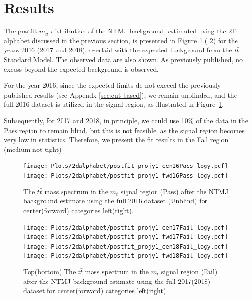 

\section{Results}
\label{sec:results}



The postfit $m_{t\bar{t}}$ distribution of the NTMJ background, estimated using the 2D alphabet discussed in the previous section, is presented in Figure \ref{fig:mttbar_spectrum_2016} ( \ref{fig:mttbar_spectrum_20172018}) for the years 2016 (2017 and 2018), overlaid with the expected background from the $t\bar{t}$ Standard Model. The observed data are also shown. As previously published, no excess beyond the expected background is observed.

For the year 2016, since the expected limits do not exceed the previously published results (see Appendx \ref{sec:cut-based}), we remain unblinded, and the full 2016 dataset is utilized in the signal region, as illustrated in Figure~\ref{fig:mttbar_spectrum_2016}.

Subsequently, for 2017 and 2018, in principle, we could use 10\% of the data in the Pass region to remain blind, but this is not feasible, as the signal region becomes very low in statistics. Therefore, we present the fit results in the Fail region (medium not tight)



\begin{figure}[h!]
	
	\begin{center}
	     \texttt{[image: Plots/2dalphabet/postfit\_projy1\_cen16Pass\_logy.pdf]} 
	     \texttt{[image: Plots/2dalphabet/postfit\_projy1\_fwd16Pass\_logy.pdf]} 
		\caption{The  $t\bar{t}$ mass spectrum in the $m_{t}$ signal region (Pass) after the NTMJ background estimate using the full 2016 dataset (Unblind) for center(forward) categories left(right). }
		\label{fig:mttbar_spectrum_2016}
	\end{center}
\end{figure}

\begin{figure}[h!]
	
	\begin{center}
		\texttt{[image: Plots/2dalphabet/postfit\_projy1\_cen17Fail\_logy.pdf]} 
		\texttt{[image: Plots/2dalphabet/postfit\_projy1\_fwd17Fail\_logy.pdf]} \\
		
		\texttt{[image: Plots/2dalphabet/postfit\_projy1\_cen18Fail\_logy.pdf]} 
		\texttt{[image: Plots/2dalphabet/postfit\_projy1\_fwd18Fail\_logy.pdf]} \\
		
		\caption{Top(bottom) The  $t\bar{t}$ mass spectrum in the $m_{t}$ signal region (Fail)  after the NTMJ background estimate using the full 2017(2018) dataset for center(forward) categories left(right). }
		\label{fig:mttbar_spectrum_20172018}
	\end{center}
\end{figure}



